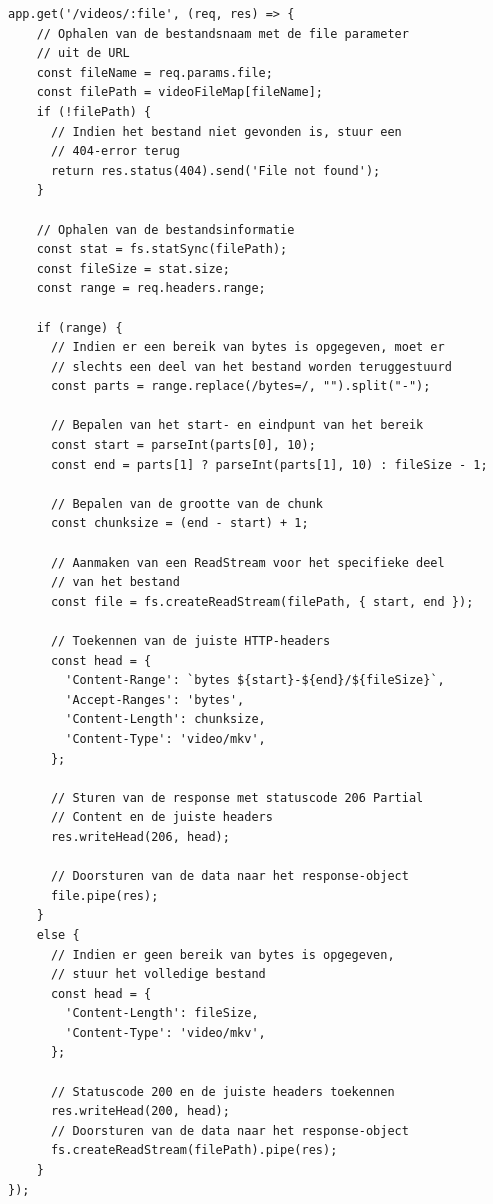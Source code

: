 \begin{mdframed}[backgroundcolor=bg]
  \begin{verbatim}
app.get('/videos/:file', (req, res) => {
    // Ophalen van de bestandsnaam met de file parameter
    // uit de URL
    const fileName = req.params.file;
    const filePath = videoFileMap[fileName];
    if (!filePath) {
      // Indien het bestand niet gevonden is, stuur een
      // 404-error terug
      return res.status(404).send('File not found');
    }

    // Ophalen van de bestandsinformatie
    const stat = fs.statSync(filePath);
    const fileSize = stat.size;
    const range = req.headers.range;

    if (range) {
      // Indien er een bereik van bytes is opgegeven, moet er
      // slechts een deel van het bestand worden teruggestuurd
      const parts = range.replace(/bytes=/, "").split("-");

      // Bepalen van het start- en eindpunt van het bereik
      const start = parseInt(parts[0], 10);
      const end = parts[1] ? parseInt(parts[1], 10) : fileSize - 1;

      // Bepalen van de grootte van de chunk
      const chunksize = (end - start) + 1;

      // Aanmaken van een ReadStream voor het specifieke deel
      // van het bestand
      const file = fs.createReadStream(filePath, { start, end });

      // Toekennen van de juiste HTTP-headers
      const head = {
        'Content-Range': `bytes ${start}-${end}/${fileSize}`,
        'Accept-Ranges': 'bytes',
        'Content-Length': chunksize,
        'Content-Type': 'video/mkv',
      };

      // Sturen van de response met statuscode 206 Partial
      // Content en de juiste headers
      res.writeHead(206, head);

      // Doorsturen van de data naar het response-object
      file.pipe(res);
    }
    else {
      // Indien er geen bereik van bytes is opgegeven,
      // stuur het volledige bestand
      const head = {
        'Content-Length': fileSize,
        'Content-Type': 'video/mkv',
      };

      // Statuscode 200 en de juiste headers toekennen
      res.writeHead(200, head);
      // Doorsturen van de data naar het response-object
      fs.createReadStream(filePath).pipe(res);
    }
});
  \end{verbatim}
\end{mdframed}


